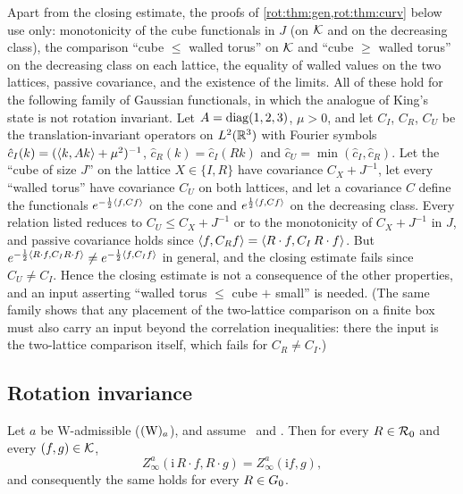 \begin{remark}\label{rot:rem:gauss}
Apart from the closing estimate, the proofs of \cref{rot:thm:gen,rot:thm:curv} below use only: monotonicity of the cube functionals in
$J$ (on $\mathcal K$ and on the decreasing class), the comparison ``cube $\le$ walled torus'' on $\mathcal K$ and ``cube $\ge$ walled torus'' on the
decreasing class on each lattice, the equality of walled values on the two lattices, passive covariance, and the existence of the
limits. All of these hold for the following family of Gaussian functionals, in which the analogue of King's state is not rotation
invariant. Let $A=\operatorname{diag}(1,2,3)$, $\mu>0$, and let $C_I$, $C_R$, $C_U$ be the translation-invariant operators on $L^2(\mathbb R^3)$ with
Fourier symbols $\hat c_I(k)=(\langle k,Ak\rangle+\mu^2)^{-1}$, $\hat c_R(k)=\hat c_I(Rk)$ and $\hat c_U=\min(\hat c_I,\hat c_R)$. Let the
``cube of size $J$'' on the lattice $X\in\{I,R\}$ have covariance $C_X+J^{-1}$, let every ``walled torus'' have covariance $C_U$ on
both lattices, and let a covariance $C$ define the functionals $e^{-\frac12\langle f,Cf\rangle}$ on the cone and $e^{\frac12\langle f,Cf\rangle}$ on the
decreasing class. Every relation listed reduces to $C_U\le C_X+J^{-1}$ or to the monotonicity of $C_X+J^{-1}$ in $J$, and passive
covariance holds since $\langle f,C_Rf\rangle=\langle R\cdot f,C_I\,R\cdot f\rangle$. But $e^{-\frac12\langle R\cdot f,C_IR\cdot f\rangle}\ne e^{-\frac12\langle f,C_If\rangle}$
in general, and the closing estimate fails since $C_U\ne C_I$. Hence the closing estimate is not a consequence of the other
properties, and an input asserting ``walled torus $\le$ cube $+$ small'' is needed. (The same family shows that any placement of the
two-lattice comparison on a finite box must also carry an input beyond the correlation inequalities: there the input is the
two-lattice comparison itself, which fails for $C_R\ne C_I$.)
\end{remark}

\subsection{Rotation invariance}

\begin{theorem}\label{rot:thm:gen}
Let $a$ be $\mathrm W$-admissible ($(\mathrm W)_{a}$), and assume \Ka\ and \TIa. Then for every $R\in\mathcal R_0$ and every $(f,g)\in\mathcal K$,
\[
Z^a_\infty(\mathrm i\,R\cdot f,R\cdot g)=Z^a_\infty(\mathrm if,g),
\]
and consequently the same holds for every $R\in G_0$.
\end{theorem}

